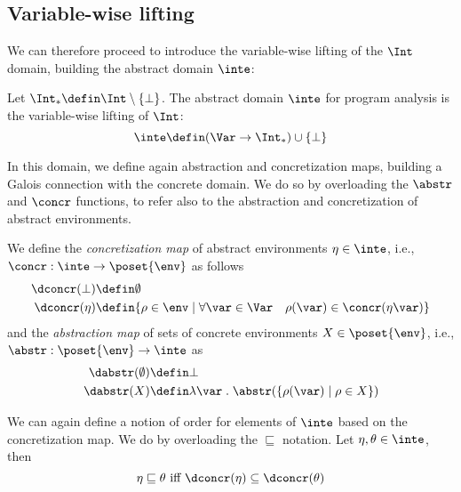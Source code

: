 \subsection{Variable-wise lifting}\label{sub:vwintervals}

We can therefore proceed to introduce the variable-wise lifting of the
\(\Int\) domain, building the abstract domain \(\inte\):

\begin{definition}
  Let \(\Int_* \defin \Int \setminus \{\bot\}\). The abstract domain
  \(\inte\) for program analysis is the variable-wise lifting of
  \(\Int\):
  \[ \inte \defin (\Var \to \Int_*) \cup \{ \bot \} \]
\end{definition}

In this domain, we define again abstraction and concretization maps,
building a Galois connection with the concrete domain. We do so by
overloading the \(\abstr\) and \(\concr\) functions, to refer also to
the abstraction and concretization of abstract environments.

\begin{definition}\label{def:vwabstr}
  We define the \emph{concretization map} of abstract environments
  \(\eta \in \inte\), i.e., \(\concr : \inte \to \poset{\env}\) as
  follows
  \begin{align*}
    \dconcr(\bot) & \defin \emptyset \\
    \dconcr(\eta) & \defin \{\rho \in \env \mid \forall \var \in \Var \quad \rho(\var) \in \concr(\eta\var)\}
  \end{align*}
  and the \emph{abstraction map} of sets of concrete environments
  \(X \in \poset{\env}\), i.e., \(\abstr : \poset{\env} \to \inte\) as
  \begin{align*}
    \dabstr(\emptyset) & \defin \bot \\
    \dabstr(X) & \defin \lambda \var \; . \; \abstr(\{\rho(\var) \mid \rho \in X\})
  \end{align*}
\end{definition}

We can again define a notion of order for elements of \(\inte\) based
on the concretization map. We do by overloading the 
\(\sqsubseteq\) notation. Let \(\eta, \theta \in \inte\), then
\begin{equation*}
  \eta \sqsubseteq \theta \text{ iff } \dconcr(\eta) \subseteq \dconcr(\theta)
\end{equation*}

